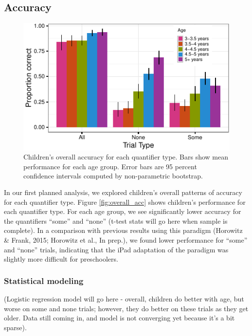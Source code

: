 \documentclass[10pt, letterpaper]{article}
\newenvironment{CodeChunk}{}{}
\begin{document}
\subsection{Accuracy}\label{accuracy}

\begin{CodeChunk}
\begin{figure}[h]
\includegraphics{figs/overll_acc-1} \caption[Children's overall accuracy for each quantifier type]{Children's overall accuracy for each quantifier type. Bars show mean performance for each age group. Error bars are 95 percent confidence intervals computed by non-parametric bootstrap.}\label{fig:overll_acc}
\end{figure}
\end{CodeChunk}

In our first planned analysis, we explored children's overall patterns
of accuracy for each quantifier type. Figure \ref{fig:overall_acc} shows
children's performance for each quantifier type. For each age group, we
see significantly lower accuracy for the quantifiers ``some'' and
``none'' (t-test stats will go here when sample is complete). In a
comparison with previous results using this paradigm (Horowitz \& Frank,
2015; Horowitz et al., In prep.), we found lower performance for
``some'' and ``none'' trials, indicating that the iPad adaptation of the
paradigm was slightly more difficult for preschoolers.

\subsubsection{Statistical modeling}\label{statistical-modeling}

(Logistic regression model will go here - overall, children do better
with age, but worse on some and none trials; however, they do better on
these trials as they get older. Data still coming in, and model is not
converging yet because it's a bit sparse).
\end{document}

